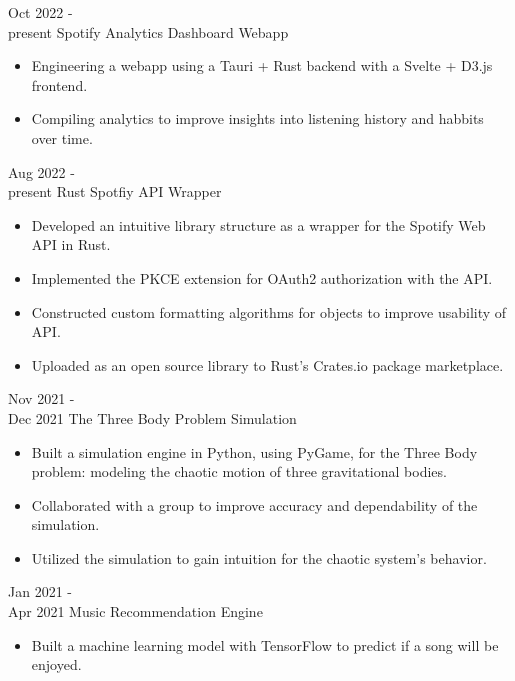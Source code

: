 \documentclass[9pt]{developercv} %
\begin{document}


\begin{entrylist}
	\entry 
		{Oct 2022 -\\present}
		{Spotify Analytics Dashboard Webapp}
		{}
		{\begin{itemize}[noitemsep, topsep=1pt]
			\item Engineering a webapp using a Tauri + Rust backend with a Svelte + D3.js frontend. 
			\item Compiling analytics to improve insights into listening history and habbits over time.
		\end{itemize}}
	\entry
		{Aug 2022 -\\present}
		{Rust Spotfiy API Wrapper}
		{}
		{\begin{itemize}[noitemsep, topsep=1pt]
			\item Developed an intuitive library structure as a wrapper for the Spotify Web API in Rust. 
			\item Implemented the PKCE extension for OAuth2 authorization with the API. 
			\item Constructed custom formatting algorithms for objects to improve usability of API.
			\item Uploaded as an open source library to Rust's Crates.io package marketplace.
		\end{itemize}}
	\entry
		{Nov 2021 -\\Dec 2021}
		{The Three Body Problem Simulation}
		{}
		{\begin{itemize}[noitemsep, topsep=1pt]
			\item Built a simulation engine in Python, using PyGame, for the Three Body problem: modeling the chaotic motion of three gravitational bodies. 
			\item Collaborated with a group to improve accuracy and dependability of the simulation.
			\item Utilized the simulation to gain intuition for the chaotic system's behavior.
		\end{itemize}}
	\entry
		{Jan 2021 -\\Apr 2021}
		{Music Recommendation Engine}
		{}
		{\begin{itemize}[noitemsep, topsep=1pt]
			\item Built a machine learning model with TensorFlow to predict if a song will be enjoyed.

\end{itemize}}
\end{entrylist}
\end{document}
